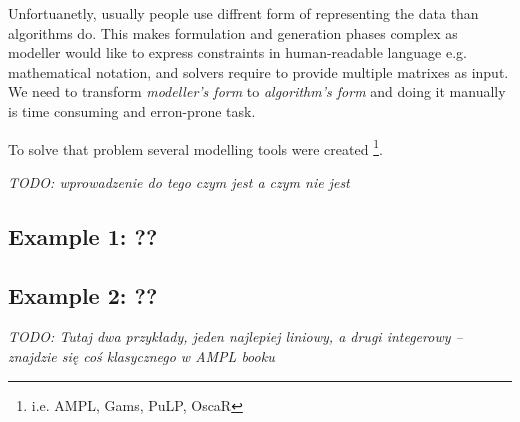 Unfortuanetly, usually people use diffrent form of representing the data than algorithms do. This makes formulation and generation phases complex as modeller would like to express constraints in human-readable language e.g. mathematical notation, and solvers require to provide multiple matrixes as input. We need to transform \emph{modeller's form} to \emph{algorithm's form} and doing it manually is time consuming and erron-prone task.

To solve that problem several modelling tools were created \footnote{i.e. AMPL, Gams, PuLP, OscaR}. 

\emph{TODO: wprowadzenie do tego czym jest a czym nie jest}

\subsection{Example 1: ??}
\subsection{Example 2: ??}

\emph{TODO: Tutaj dwa przykłady, jeden najlepiej liniowy, a drugi integerowy – znajdzie się coś klasycznego w AMPL booku}
